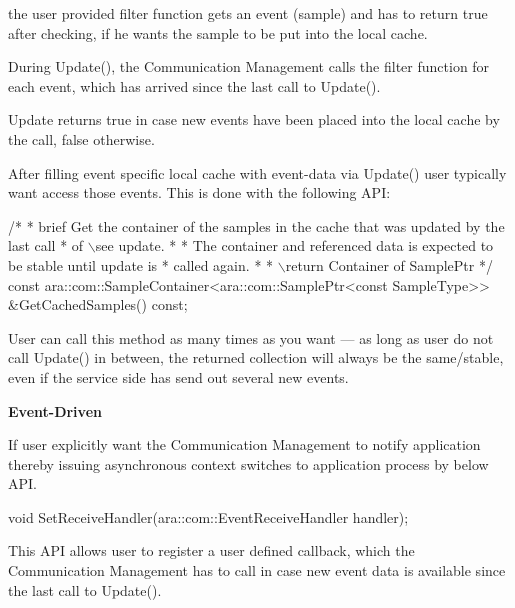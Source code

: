 \begin{DoxyItemize}
\begin{DoxyItemize}
\item the user provided filter function gets an event (sample) and has to return true after checking, if he wants the sample to be put into the local cache.
\item During Update(), the Communication Management calls the filter function for each event, which has arrived since the last call to Update().
\item Update returns true in case new events have been placed into the local cache by the call, false otherwise.
\item After filling event specific local cache with event-\/data via Update() user typically want access those events. This is done with the following A\+PI\+: 
\begin{DoxyCode}
\textcolor{comment}{/*}
\textcolor{comment}{ * brief Get the container of the samples in the cache that was updated by the last call}
\textcolor{comment}{ * of \(\backslash\)see update.}
\textcolor{comment}{ *}
\textcolor{comment}{ * The container and referenced data is expected to be stable until update is}
\textcolor{comment}{ * called again.}
\textcolor{comment}{ *}
\textcolor{comment}{ * \(\backslash\)return Container of SamplePtr}
\textcolor{comment}{ */}
 \textcolor{keyword}{const} ara::com::SampleContainer<ara::com::SamplePtr<const SampleType>> &GetCachedSamples() \textcolor{keyword}{const};
\end{DoxyCode}

\item User can call this method as many times as you want — as long as user do not call Update() in between, the returned collection will always be the same/stable, even if the service side has send out several new events.
\end{DoxyItemize}
\item {\bfseries Event-\/\+Driven}
\item If user explicitly want the Communication Management to notify application thereby issuing asynchronous context switches to application process by below A\+PI.
\end{DoxyItemize}


\begin{DoxyCode}
\textcolor{keywordtype}{void} SetReceiveHandler(ara::com::EventReceiveHandler handler);
\end{DoxyCode}

\begin{DoxyItemize}
\item This A\+PI allows user to register a user defined callback, which the Communication Management has to call in case new event data is available since the last call to Update().
\end{DoxyItemize}

